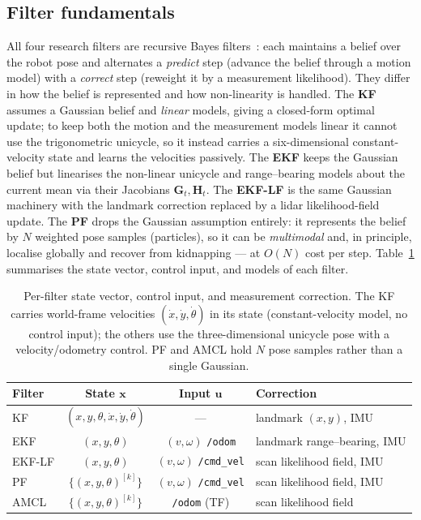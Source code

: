 \documentclass[conference]{IEEEtran}
\begin{document}
\subsection{Filter fundamentals}
All four research filters are recursive Bayes filters~\cite{Thrun2005}: each maintains a belief over the robot pose and alternates a \emph{predict} step (advance the belief through a motion model) with a \emph{correct} step (reweight it by a measurement likelihood). They differ in how the belief is represented and how non-linearity is handled. The \textbf{KF} assumes a Gaussian belief and \emph{linear} models, giving a closed-form optimal update; to keep both the motion and the measurement models linear it cannot use the trigonometric unicycle, so it instead carries a six-dimensional constant-velocity state and learns the velocities passively. The \textbf{EKF} keeps the Gaussian belief but linearises the non-linear unicycle and range--bearing models about the current mean via their Jacobians $\mathbf{G}_t,\mathbf{H}_t$. The \textbf{EKF-LF} is the same Gaussian machinery with the landmark correction replaced by a lidar likelihood-field update. The \textbf{PF} drops the Gaussian assumption entirely: it represents the belief by $N$ weighted pose samples (particles), so it can be \emph{multimodal} and, in principle, localise globally and recover from kidnapping --- at $O(N)$ cost per step. Table~\ref{tab:filters} summarises the state vector, control input, and models of each filter.

\begin{table}[!t]
\centering
\setlength{\tabcolsep}{0.4em}
{\renewcommand{\arraystretch}{1.3}
\begin{tabular}{|l|c|c|l|}
\hline
\textbf{Filter} & \textbf{State $\mathbf{x}$} & \textbf{Input $\mathbf{u}$} & \textbf{Correction} \\ \hline
KF     & $(x,y,\theta,\dot x,\dot y,\dot\theta)$ & --- & landmark $(x,y)$, IMU \\ \hline
EKF    & $(x,y,\theta)$ & $(v,\omega)$ \texttt{/odom}     & landmark range--bearing, IMU \\ \hline
EKF-LF & $(x,y,\theta)$ & $(v,\omega)$ \texttt{/cmd\_vel} & scan likelihood field, IMU \\ \hline
PF     & $\{(x,y,\theta)^{[k]}\}$ & $(v,\omega)$ \texttt{/cmd\_vel} & scan likelihood field, IMU \\ \hline
AMCL   & $\{(x,y,\theta)^{[k]}\}$ & \texttt{/odom} (TF) & scan likelihood field \\ \hline
\end{tabular}}
\caption{Per-filter state vector, control input, and measurement correction. The KF carries world-frame velocities $(\dot x,\dot y,\dot\theta)$ in its state (constant-velocity model, no control input); the others use the three-dimensional unicycle pose with a velocity/odometry control. PF and AMCL hold $N$ pose samples rather than a single Gaussian.}
\label{tab:filters}
\end{table}
\end{document}
